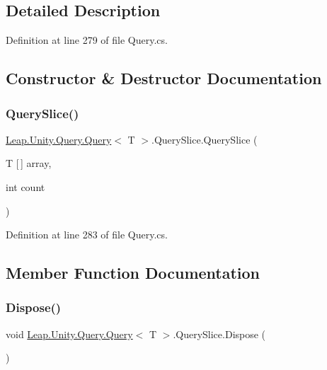 \subsection{Detailed Description}


Definition at line 279 of file Query.\+cs.



\subsection{Constructor \& Destructor Documentation}
\mbox{\label{struct_leap_1_1_unity_1_1_query_1_1_query_1_1_query_slice_a6183738029036bc563835eee8fee7dbc}} 
\subsubsection{\texorpdfstring{QuerySlice()}{QuerySlice()}}
{\footnotesize\ttfamily \mbox{\hyperlink{struct_leap_1_1_unity_1_1_query_1_1_query}{Leap.\+Unity.\+Query.\+Query}}$<$ T $>$.Query\+Slice.\+Query\+Slice (\begin{DoxyParamCaption}\item[{T \mbox{[}$\,$\mbox{]}}]{array,  }\item[{int}]{count }\end{DoxyParamCaption})}



Definition at line 283 of file Query.\+cs.



\subsection{Member Function Documentation}
\mbox{\label{struct_leap_1_1_unity_1_1_query_1_1_query_1_1_query_slice_ac55109634717c8cbbc44aefb5c686040}} 
\subsubsection{\texorpdfstring{Dispose()}{Dispose()}}
{\footnotesize\ttfamily void \mbox{\hyperlink{struct_leap_1_1_unity_1_1_query_1_1_query}{Leap.\+Unity.\+Query.\+Query}}$<$ T $>$.Query\+Slice.\+Dispose (\begin{DoxyParamCaption}{ }\end{DoxyParamCaption})}



